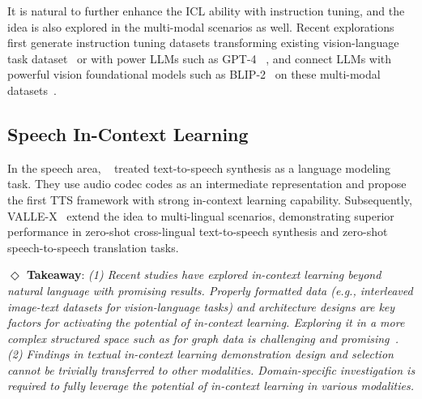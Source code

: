 It is natural to further enhance the ICL ability with instruction tuning, and the idea is also explored in the multi-modal scenarios as well.
Recent explorations first generate instruction tuning datasets transforming existing vision-language task dataset~\citep{xu2022multiinstruct,li2023otter} or with power LLMs such as GPT-4~\citep{liu2023llava,zhu2023minigpt4} , and connect LLMs with powerful vision foundational models such as BLIP-2~\citep{li2023blip2} on these multi-modal datasets~\citep{zhu2023minigpt4,dai2023instructblip}.




\subsection{Speech In-Context Learning}
In the speech area, ~\citet{wang2023neural} treated text-to-speech synthesis as a language modeling task. 
They use audio codec codes as an intermediate representation and propose the first TTS framework with strong in-context learning capability. 
Subsequently, VALLE-X~\citep{zhang2023valle-x} extend the idea to multi-lingual scenarios, demonstrating superior performance in zero-shot cross-lingual text-to-speech synthesis and zero-shot speech-to-speech translation tasks.

\textbf{$\Diamond$ Takeaway}: 
\textit{
(1) Recent studies have explored in-context learning beyond natural language with promising results.
Properly formatted data (e.g., interleaved image-text datasets for vision-language tasks) and architecture designs are key factors for activating the potential of in-context learning. Exploring it in a more complex structured space such as for graph data is challenging and promising~\citep{huang2023graph_icl}.
(2) Findings in textual in-context learning demonstration design and selection cannot be trivially transferred to other modalities. Domain-specific investigation is required to fully leverage the potential of in-context learning in various modalities.
}

% 

